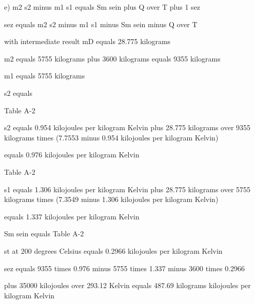 e) m2 s2 minus m1 s1 equals Sm sein plus Q over T plus 1 sez

sez equals m2 s2 minus m1 s1 minus Sm sein minus Q over T

with intermediate result mD equals 28.775 kilograms

m2 equals 5755 kilograms plus 3600 kilograms equals 9355 kilograms

m1 equals 5755 kilograms

s2 equals

Table A-2

s2 equals 0.954 kilojoules per kilogram Kelvin plus 28.775 kilograms over 9355 kilograms times (7.7553 minus 0.954 kilojoules per kilogram Kelvin)

equals 0.976 kilojoules per kilogram Kelvin

Table A-2

s1 equals 1.306 kilojoules per kilogram Kelvin plus 28.775 kilograms over 5755 kilograms times (7.3549 minus 1.306 kilojoules per kilogram Kelvin)

equals 1.337 kilojoules per kilogram Kelvin

Sm sein equals Table A-2

st at 200 degrees Celsius equals 0.2966 kilojoules per kilogram Kelvin

sez equals 9355 times 0.976 minus 5755 times 1.337 minus 3600 times 0.2966

plus 35000 kilojoules over 293.12 Kelvin equals 487.69 kilograms kilojoules per kilogram Kelvin